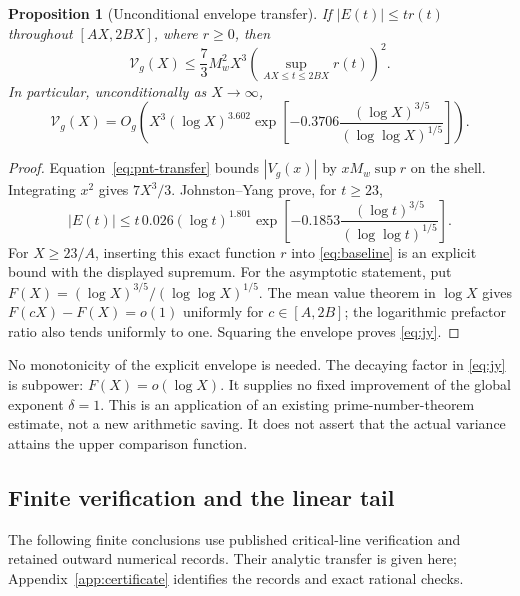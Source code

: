 \documentclass[11pt]{article}
\newtheorem{proposition}[theorem]{Proposition}
\theoremstyle{remark}
\newcommand{\Vcal}{\mathcal V_g}
\numberwithin{equation}{section}
\begin{document}
\begin{proposition}[Unconditional envelope transfer]\label{prop:baseline}
If $|E(t)|\le t r(t)$ throughout $[AX,2BX]$, where $r\ge0$, then
\begin{equation}\label{eq:baseline}
\Vcal(X)\le\frac73M_w^2X^3
\left(\sup_{AX\le t\le2BX}r(t)\right)^2.
\end{equation}
In particular, unconditionally as $X\to\infty$,
\begin{equation}\label{eq:jy}
\Vcal(X)=O_g\left(X^3(\log X)^{3.602}
\exp\left[-0.3706\frac{(\log X)^{3/5}}{(\log\log X)^{1/5}}\right]\right).
\end{equation}
\end{proposition}
\begin{proof}
Equation~\eqref{eq:pnt-transfer} bounds $|V_g(x)|$ by
$xM_w\sup r$ on the shell. Integrating $x^2$ gives $7X^3/3$.
Johnston--Yang \cite[Theorem 1.4]{JY} prove, for $t\ge23$,
\[
|E(t)|\le t\,0.026(\log t)^{1.801}
\exp\left[-0.1853\frac{(\log t)^{3/5}}{(\log\log t)^{1/5}}\right].
\]
For $X\ge23/A$, inserting this exact function $r$ into
\eqref{eq:baseline} is an explicit bound with the displayed supremum.
For the asymptotic statement, put
$F(X)=(\log X)^{3/5}/(\log\log X)^{1/5}$.
The mean value theorem in $\log X$ gives
$F(cX)-F(X)=o(1)$ uniformly for $c\in[A,2B]$; the logarithmic
prefactor ratio also tends uniformly to one. Squaring the envelope
proves \eqref{eq:jy}.
\end{proof}

No monotonicity of the explicit envelope is needed. The decaying factor
in \eqref{eq:jy} is subpower: $F(X)=o(\log X)$. It supplies no fixed
improvement of the global exponent $\delta=1$. This is an application
of an existing prime-number-theorem estimate, not a new arithmetic
saving. It does not assert that the actual variance attains the upper
comparison function.

\subsection{Finite verification and the linear tail}
The following finite conclusions use published critical-line verification
and retained outward numerical records. Their analytic transfer is given
here; Appendix~\ref{app:certificate} identifies the records and exact
rational checks.
\end{document}
